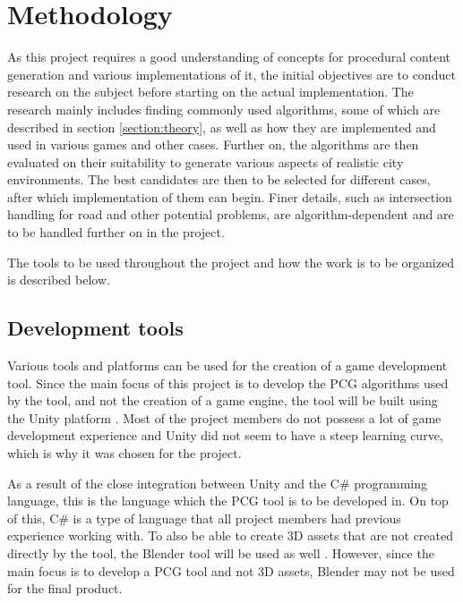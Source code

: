\section{Methodology}
\label{section:methodology}

As this project requires a good understanding of concepts for procedural content generation and various implementations of it, the initial objectives are to conduct research on the subject before starting on the actual implementation. The research mainly includes finding commonly used algorithms, some of which are described in section \ref{section:theory}, as well as how they are implemented and used in various games and other cases. Further on, the algorithms are then evaluated on their suitability to generate various aspects of realistic city environments. The best candidates are then to be selected for different cases, after which implementation of them can begin. Finer details, such as intersection handling for road and other potential problems, are algorithm-dependent and are to be handled further on in the project. 

The tools to be used throughout the project and how the work is to be organized is described below.

\subsection{Development tools}
Various tools and platforms can be used for the creation of a game development tool. Since the main focus of this project is to develop the PCG algorithms used by the tool, and not the creation of a game engine, the tool will be built using the Unity platform \cite{Unity}. Most of the project members do not possess a lot of game development experience and Unity did not seem to have a steep learning curve, which is why it was chosen for the project.

As a result of the close integration between Unity and the C\# programming language, this is the language which the PCG tool is to be developed in. On top of this, C\# is a type of language that all project members had previous experience working with. To also be able to create 3D assets that are not created directly by the tool, the Blender tool will be used as well \cite{Blender}. However, since the main focus is to develop a PCG tool and not 3D assets, Blender may not be used for the final product.

